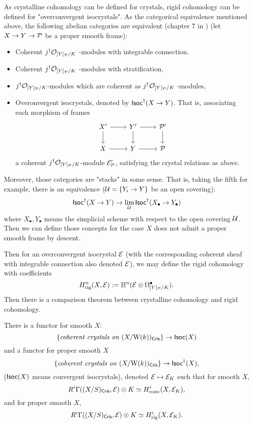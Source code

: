 As crystalline cohomology can be defined for crystals, 
rigid cohomology can be defined for "overconvergent isocrystals". 
As the categorical equivalence mentioned above, 
the following abelian categories are equivalent 
(chapter 7 in \cite{St}) (let $X \to Y \to {\mathcal {P}}$ be a proper smooth frame):
\begin{itemize}
    \item 
        Coherent $j^\dagger {\mathcal {O}}_{]Y[_{\mathcal {P}}/K}$ -modules with integrable connection.
    \item 
        Coherent $j^\dagger {\mathcal {O}}_{]Y[_{\mathcal {P}}/K}$ -modules with stratification,
    \item 
        $j^\dagger {\mathcal {O}}_{]Y[_{\mathcal {P}}/K}$-modules 
        which are coherent as $j^\dagger {\mathcal {O}}_{]Y[_{\mathcal {P}}/K}$ -modules,
    \item 
        Overonvergent isocrystals, denoted by $\mathsf{Isoc}^\dagger(X \to Y)$. 
        That is, associating each morphism of frames
        \[
            \begin{tikzcd}
                X' \ar[r] \ar[d] & Y' \ar[r] \ar[d] & \CP' \ar[d] \\
                X \ar[r] & Y \ar[r]& \CP
            \end{tikzcd}
        \]
    a coherent $j^\dagger {\mathcal {O}}_{]Y[_{\mathcal {P}}/K}$-module ${\mathcal {E}}_{\mathcal {P}}'$, 
    satisfying the crystal relations as above.
\end{itemize}

Moreover, those categories are "stacks" in some sense. 
That is, taking the fifth for example, 
there is an equivalence (${\mathcal {U}} = \{Y_i \to Y\}$ be an open covering):
\[
    \mathsf{Isoc}^\dagger (X \to Y) \to \lim_{{\mathcal {U}}} \mathsf{Isoc}^\dagger (X_\bullet \to Y_\bullet)
\]
where $X_\bullet,Y_\bullet$ means the simplicial scheme with respect to the open covering ${\mathcal {U}}$. 
Then we can define those concepts for the case $X$ 
does not admit a proper smooth frame by descent.

Then for an overconvergent isocrystal ${\mathcal {E}}$ 
(with the corresponding coherent sheaf with integrable connection also denoted ${\mathcal {E}}$), 
we may define the rigid cohomology with coefficients
\[
    H^n_{\mathrm{rig}}(X,{\mathcal {E}}) := {\mathbb {H}}^n({\mathcal {E}} \otimes \Omega_{]Y[_{\mathcal {P}}/K}^\bullet).
\]
Then there is a comparison theorem between crystalline cohomology and rigid cohomology.
\begin{theorem}
    There is a functor for smooth $X$:
    \[
        \{\textit{coherent crystals on } (X/\mathrm{W}(k))_{\mathsf{Cris}}\} \to \mathsf{Isoc}(X)
    \]
    and a functor for proper smooth $X$
    \[
        \{\textit{coherent crystals on }(X/\mathrm{W}(k))_{\mathsf{Cris}}\} \to \mathsf{Isoc}^\dagger(X),
    \]
    ($\mathsf{Isoc}(X)$ means convergent isocrystals), 
    denoted ${\mathcal {E}} \mapsto {\mathcal {E}}_K$ such that for smooth $X$,
    \[
        R^i\Gamma((X/S)_{\mathsf{Cris}}, {\mathcal {E}}) \otimes K \simeq H^i_{\mathrm{conv}}(X, {\mathcal {E}}_K),
    \]
    and for proper smooth $X$,
    \[
        R^i\Gamma((X/S)_{\mathsf{Cris}}, {\mathcal {E}}) \otimes K \simeq H^i_{\mathrm{rig}}(X, {\mathcal {E}}_K).
    \]
\end{theorem}

